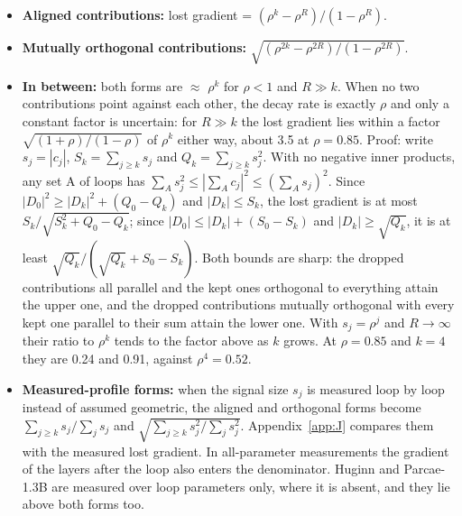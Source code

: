\documentclass[10pt]{article}
\begin{document}
\begin{itemize}
\item \textbf{Aligned contributions:} lost gradient = $(\rho^{k}-\rho^{R})/(1-\rho^{R})$.
\item \textbf{Mutually orthogonal contributions:} $\sqrt{(\rho^{2k}-\rho^{2R})/(1-\rho^{2R})}$.
\item \textbf{In between:} both forms are $\approx$ $\rho^{k}$ for $\rho < 1$ and $R \gg  k$. When no two contributions point against each other, the decay rate is exactly $\rho$ and only a constant factor is uncertain: for $R \gg  k$ the lost gradient lies within a factor $\sqrt{(1+\rho)/(1-\rho)}$ of $\rho^{k}$ either way, about 3.5 at $\rho = 0.85$. Proof: write $s_j = |c_j|$, $S_k = \sum_{j\geq k} s_j$ and $Q_k = \sum_{j\geq k} s_j^2$. With no negative inner products, any set A of loops has $\sum_A s_j^2 \leq |\sum_A c_j|^2 \leq (\sum_A s_j)^2$. Since $|D_0|^2 \geq |D_k|^2 + (Q_0 - Q_k)$ and $|D_k| \leq S_k$, the lost gradient is at most $S_k/\sqrt{S_k^2 + Q_0 - Q_k}$; since $|D_0| \leq |D_k| + (S_0 - S_k)$ and $|D_k| \geq \sqrt{Q_k}$, it is at least $\sqrt{Q_k}/(\sqrt{Q_k} + S_0 - S_k)$. Both bounds are sharp: the dropped contributions all parallel and the kept ones orthogonal to everything attain the upper one, and the dropped contributions mutually orthogonal with every kept one parallel to their sum attain the lower one. With $s_j = \rho^{j}$ and $R \to \infty$ their ratio to $\rho^{k}$ tends to the factor above as $k$ grows. At $\rho = 0.85$ and $k = 4$ they are 0.24 and 0.91, against $\rho^{4} = 0.52$.
\item \textbf{Measured-profile forms:} when the signal size $s_j$ is measured loop by loop instead of assumed geometric, the aligned and orthogonal forms become $\sum_{j\geq k} s_j / \sum_j s_j$ and $\sqrt{\sum_{j\geq k} s_j^2 / \sum_j s_j^2}$. Appendix~\ref{app:J} compares them with the measured lost gradient. In all-parameter measurements the gradient of the layers after the loop also enters the denominator. Huginn and Parcae-1.3B are measured over loop parameters only, where it is absent, and they lie above both forms too.

\end{itemize}
\end{document}
